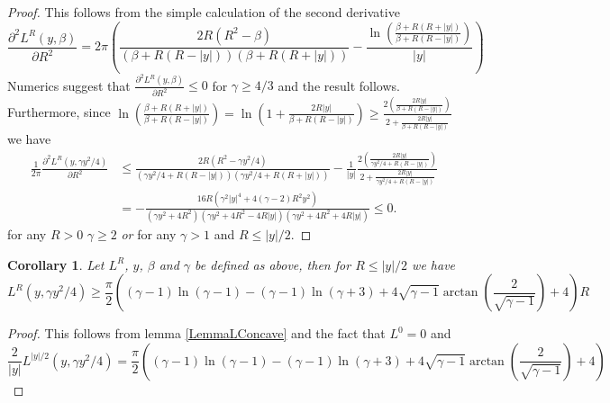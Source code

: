 \documentclass[a4paper,11pt]{article}
\newcommand{\abs}[1]{\left\lvert #1 \right\rvert}
\newtheorem{corollary}{Corollary}
\numberwithin{equation}{section}
\begin{document}
\begin{proof}
	This follows from the simple calculation of the second derivative\begin{equation}
	\frac{\partial^2L^R(y,\beta)}{\partial R^2}=2\pi\left(\frac{2 R \left(R^2-\beta \right)}{\left(\beta +R(R- \abs{y})\right) (\beta +R (R+\abs{y}))}-\frac{\ln \left(\frac{\beta +R (R+\abs{y})}{\beta +R(R- \abs{y})}\right)}{\abs{y}}\right)
	\end{equation}
	Numerics suggest that $ \frac{\partial^2L^R(y,\beta)}{\partial R^2}\leq0 $ for $ \gamma\geq4/3 $ and the result follows. Furthermore, since $ \ln \left(\frac{\beta +R (R+\abs{y})}{\beta +R(R- \abs{y})}\right)=\ln \left(1+\frac{2R\abs{y}}{\beta +R(R- \abs{y})}\right)\geq\frac{2\left(\frac{2R\abs{y}}{\beta +R(R- \abs{y})}\right)}{2+\frac{2R\abs{y}}{\beta +R(R- \abs{y})}} $ we have \begin{equation}
	\begin{aligned}
	\frac{1}{2\pi}\frac{\partial^2L^R(y,\gamma y^2/4)}{\partial R^2}&\leq \frac{2 R \left(R^2-\gamma y^2/4 \right)}{\left(\gamma y^2/4 +R(R- \abs{y})\right) (\gamma y^2/4 +R (R+\abs{y}))}-\frac{1}{\abs{y}}\frac{2\left(\frac{2R\abs{y}}{\gamma y^2/4 +R(R- \abs{y})}\right)}{2+\frac{2R\abs{y}}{\gamma y^2/4 +R(R- \abs{y})}}\\&=-\frac{16 R \left(\gamma^2 \abs{y}^4+4 (\gamma-2) R^2 y^2\right)}{\left(\gamma y^2+4 R^2\right) \left(\gamma y^2+4 R^2-4 R \abs{y}\right) \left(\gamma y^2+4 R^2+4 R \abs{y}\right)}\leq0.
	\end{aligned}
	\end{equation}
	for any $ R>0 $ $ \gamma\geq2 $ \emph{or} for any $ \gamma>1 $ and $ R\leq\abs{y}/2 $.
\end{proof}
\begin{corollary}
	Let $ L^R $, $ y $, $ \beta $ and $ \gamma $ be defined as above, then for $ R\leq\abs{y}/2 $ we have \begin{equation}
	L^R(y,\gamma y^2/4)\geq \frac{\pi}{2} \left((\gamma -1) \ln (\gamma -1)-(\gamma -1) \ln (\gamma +3)+4 \sqrt{\gamma -1} \arctan\left(\frac{2}{\sqrt{\gamma -1}}\right)+4\right)R
	\end{equation}
\end{corollary}
\begin{proof}
	This follows from lemma \ref{LemmaLConcave} and the fact that $ L^0=0  $ and \begin{equation}
	\frac{2}{\abs{y}}L^{\abs{y}/2}(y,\gamma y^2/4)=\frac{\pi}{2} \left((\gamma -1) \ln (\gamma -1)-(\gamma -1) \ln (\gamma +3)+4 \sqrt{\gamma -1} \arctan\left(\frac{2}{\sqrt{\gamma -1}}\right)+4\right)
	\end{equation}
\end{proof}
\end{document}
